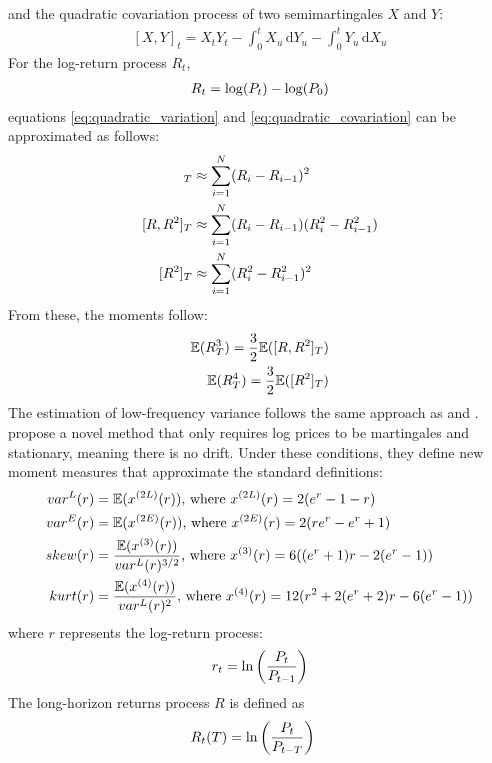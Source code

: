 and the quadratic covariation process of two semimartingales $X$ and $Y$:
\begin{align}
    \label{eq:quadratic_covariation}
    [X,Y]_t = X_tY_t - \int_0^tX_u\,\mathrm{d}Y_u - \int_0^tY_u\,\mathrm{d}X_u
\end{align}
For the log-return process $R_t$,
\begin{align}
    R_t = \log(P_t) - \log(P_0)\notag
\end{align}
equations \eqref{eq:quadratic_variation} and \eqref{eq:quadratic_covariation} can be approximated as follows:
\begin{align}
    [R]_T &\approx \sum_{i=1}^N (R_i - R_{i-1})^2\notag\\
    [R,R^2]_T &\approx \sum_{i=1}^N (R_i - R_{i-1})(R_i^2 - R_{i-1}^2)\notag \\
    [R^2]_T &\approx \sum_{i=1}^N (R_i^2 - R_{i-1}^2)^2\notag
\end{align}
From these, the moments follow:
\begin{align}
    \mathbb{E}(R_T^3) = \frac{3}{2}\mathbb{E}([R,R^2]_T)\notag\\
    \mathbb{E}(R_T^4) = \frac{3}{2}\mathbb{E}([R^2]_T)\notag
\end{align}
The estimation of low-frequency variance follows the same approach as \cite{andersenAnsweringSkepticsYes1998} and \cite{amayaDoesRealizedSkewness2015}. \cite{neubergerSkewnessStockMarket2021} propose a novel method that only requires log prices to be martingales and stationary, meaning there is no drift. Under these conditions, they define new moment measures that approximate the standard definitions:
\begin{align}
    var^L(r) &= \mathbb{E}(x^{(2L)}(r))\text{, where } x^{(2L)}(r) = 2(e^r-1-r) \notag \\
    var^E(r) &= \mathbb{E}(x^{(2E)}(r))\text{, where } x^{(2E)}(r) = 2(re^r-e^r+1) \notag \\
    skew(r) &= \frac{\mathbb{E}(x^{(3)}(r))}{var^L(r)^{3/2}}\text{, where } x^{(3)}(r) = 6((e^r+1)r - 2(e^r-1)) \notag \\
    kurt(r) &= \frac{\mathbb{E}(x^{(4)}(r))}{var^L(r)^2}\text{, where } x^{(4)}(r) = 12(r^2 + 2(e^r+2)r - 6(e^r-1)) \notag
\end{align}
where $r$ represents the log-return process:
\begin{align}
    r_t = \ln\left(\frac{P_t}{P_{t-1}}\right) \notag
\end{align}
The long-horizon returns process $R$ is defined as
\begin{align}
    R_t(T) &= \ln\left(\frac{P_t}{P_{t-T}}\right) \notag
\end{align}
